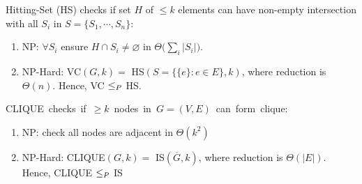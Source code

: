 \documentclass[12pt, a4paper]{article}
\begin{document}
\begin{multicols*}{3}
Hitting-Set (HS) checks if set $H$ of $\leq k$ elements can have non-empty intersection with all $S_i$ in $S =\{S_1,\cdots,S_n\}$:
\begin{enumerate}[\roman*]
  \item NP: $\forall S_i$ ensure $H\cap S_i\neq\varnothing$ in $\Theta\bigl(\sum_i|S_i|\bigr)$.
  \item NP-Hard: VC$(G, k) =$ HS$(S = \{ \{e\} : e \in E\} , k)$, where reduction is $\Theta(n)$. Hence, VC $\leq_{P}$ HS.
\end{enumerate}

\mbox{CLIQUE checks if $\geq k$ nodes in $G = (V, E)$ can form clique:}
\begin{enumerate}[\roman*.]
  \item NP: check all nodes are adjacent in $\Theta(k^2)$
  \item NP-Hard: CLIQUE$(G, k) =$ IS$(\overline{G}, k)$, where reduction is $\Theta(|E|)$. Hence, CLIQUE $\leq_{P}$ IS
\end{enumerate}

\end{multicols*}
\end{document}
